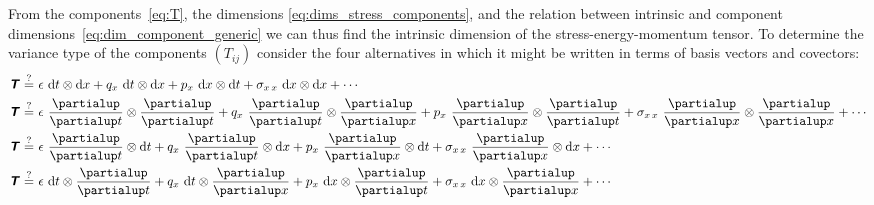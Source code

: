 \documentclass[\ifafour a4paper,12pt,\else a5paper,10pt,\fi%
onecolumn,oneside,article,%
british%
]{memoir}
\theoremstyle{remark}
\theoremstyle{innote}
\newcommand*{\mathte}[1]{\textbf{\textit{\textsf{#1}}}}
\newcommand*{\de}{\partialup}%
\newcommand*{\di}{\mathrm{d}}%
\renewcommand*{\|}[1][]{\nonscript\,#1\vert\nonscript\;\mathopen{}}
\newcommand*{\yT}{\mathte{T}}
\newcommand*{\dex}[1][i]{\frac{\de}{\de x^{#1}}}
\newcommand*{\dix}[1][i]{\di x^{#1}}
\newcommand*{\en}{\epsilon}
\newcommand*{\yq}{q}
\newcommand*{\yp}{p}
\newcommand*{\yt}{\sigma}
\begin{document}
From the components~\eqref{eq:T}, the dimensions
\eqref{eq:dims_stress_components}, and the relation between intrinsic and
component dimensions~\eqref{eq:dim_component_generic} we can thus find the
intrinsic dimension of the stress-energy-momentum tensor. To determine the
variance type of the components $(T_{ij})$ consider the four alternatives in
which it might be written in terms of basis vectors and covectors:
\begin{equation*}
  \begin{aligned}
    \yT \stackrel{?}{=}
  &\ \en\  \di t\otimes\di x +
  \yq_{x}\  \di t\otimes\di x +
  \yp_{x}\  \di x\otimes\di t +
  \yt_{x\,x}\  \di x\otimes\di x + \dotsb
\\ %
\yT \stackrel{?}{=}    &\ \en\  \frac{\de}{\de t}\otimes\frac{\de}{\de t} +
  \yq_{x}\  \frac{\de}{\de t}\otimes\frac{\de}{\de x} +
  \yp_{x}\  \frac{\de}{\de x}\otimes\frac{\de}{\de t} +
  \yt_{x\, x}\  \frac{\de}{\de x}\otimes\frac{\de}{\de x} + \dotsb
\\ %
 \yT \stackrel{?}{=} &\ \en\  \frac{\de}{\de t}\otimes\di t +
  \yq_{x}\  \frac{\de}{\de t}\otimes\di x +
  \yp_{x}\  \frac{\de}{\de x}\otimes\di t +
  \yt_{x\, x}\  \frac{\de}{\de x}\otimes\di x + \dotsb
\\ %
\yT \stackrel{?}{=}  &\ \en\  \di t\otimes\frac{\de}{\de t} +
  \yq_{x}\  \di t\otimes\frac{\de}{\de x} +
  \yp_{x}\  \di x\otimes\frac{\de}{\de t} +
  \yt_{x\, x}\  \di x\otimes\frac{\de}{\de x} + \dotsb
  \end{aligned}
\end{equation*}
\end{document}
